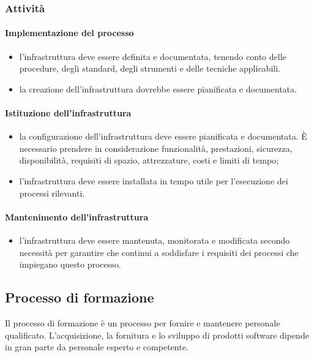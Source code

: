 		\subsubsection{Attività}
		\paragraph{Implementazione del processo}
		\begin{itemize}
			\item l'infrastruttura deve essere definita e documentata, tenendo conto delle procedure, degli standard, degli strumenti e delle tecniche applicabili.
			\item  la creazione dell'infrastruttura dovrebbe essere pianificata e documentata.
		\end{itemize}
		\paragraph{Istituzione dell'infrastruttura}
		\begin{itemize}
			\item la configurazione dell'infrastruttura deve essere pianificata e documentata. È necessario prendere in considerazione funzionalità, prestazioni, sicurezza, disponibilità, requisiti di spazio, attrezzature, costi e limiti di tempo;
			\item l'infrastruttura deve essere installata in tempo utile per l'esecuzione dei processi rilevanti.
		\end{itemize}
		\paragraph{Mantenimento dell'infrastruttura}
		\begin{itemize}
			\item l'infrastruttura deve essere mantenuta, monitorata e modificata secondo necessità per garantire che continui a soddisfare i requisiti dei processi che impiegano questo processo. 
		\end{itemize}
		
			
			
		
	
		
		
		
		
		\subsection{Processo di formazione}
		
	Il processo di formazione è un processo per fornire e mantenere personale qualificato. L'acquisizione, la fornitura e lo sviluppo  di prodotti software dipende in gran parte da personale esperto e competente. 

